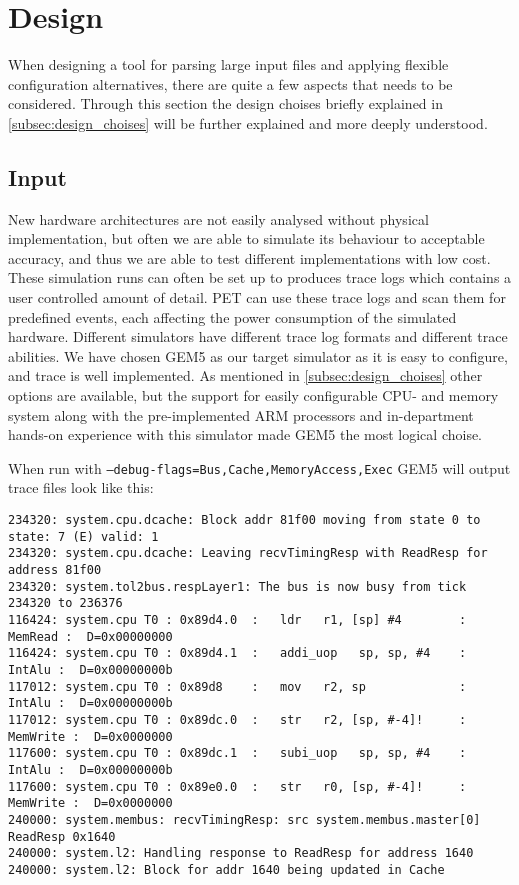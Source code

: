\section{Design}
When designing a tool for parsing large input files and applying flexible configuration alternatives,
there are quite a few aspects that needs to be considered. Through this section the design choises
briefly explained in \autoref{subsec:design_choises} will be further explained and more deeply understood.

\subsection{Input}
New hardware architectures are not easily analysed without physical
implementation, but often we are able to simulate its behaviour to acceptable
accuracy, and thus we are able to test different implementations with low cost.
These simulation runs can often be set up to produces trace logs which contains
a user controlled amount of detail. PET can use these trace logs and scan them
for predefined events, each affecting the power consumption of the simulated
hardware. Different simulators have different trace log formats and different
trace abilities. We have chosen GEM5 as our target simulator as it is easy to
configure, and trace is well implemented. As mentioned in
\autoref{subsec:design_choises} other options are available, but the support for
easily configurable CPU- and memory system along with the pre-implemented ARM
processors and in-department hands-on experience with this simulator made GEM5
the most logical choise.

When run with \texttt{--debug-flags=Bus,Cache,MemoryAccess,Exec} GEM5 will output trace files look like this:
\begin{lstlisting}
234320: system.cpu.dcache: Block addr 81f00 moving from state 0 to state: 7 (E) valid: 1
234320: system.cpu.dcache: Leaving recvTimingResp with ReadResp for address 81f00
234320: system.tol2bus.respLayer1: The bus is now busy from tick 234320 to 236376
116424: system.cpu T0 : 0x89d4.0  :   ldr   r1, [sp] #4        : MemRead :  D=0x00000000
116424: system.cpu T0 : 0x89d4.1  :   addi_uop   sp, sp, #4    : IntAlu :  D=0x00000000b
117012: system.cpu T0 : 0x89d8    :   mov   r2, sp             : IntAlu :  D=0x00000000b
117012: system.cpu T0 : 0x89dc.0  :   str   r2, [sp, #-4]!     : MemWrite :  D=0x0000000
117600: system.cpu T0 : 0x89dc.1  :   subi_uop   sp, sp, #4    : IntAlu :  D=0x00000000b
117600: system.cpu T0 : 0x89e0.0  :   str   r0, [sp, #-4]!     : MemWrite :  D=0x0000000
240000: system.membus: recvTimingResp: src system.membus.master[0] ReadResp 0x1640
240000: system.l2: Handling response to ReadResp for address 1640
240000: system.l2: Block for addr 1640 being updated in Cache
\end{lstlisting}

